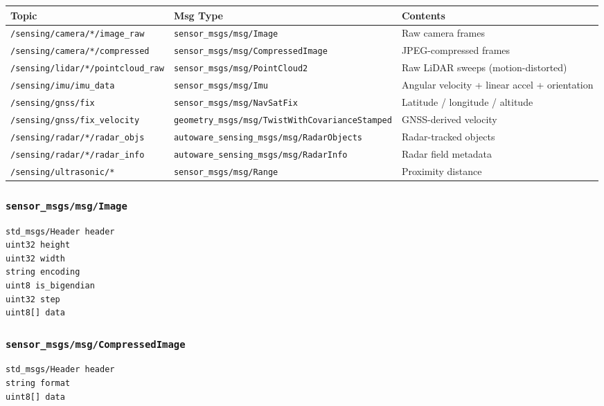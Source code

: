 \documentclass[
]{article}
\begin{document}
\begin{longtable}[]{@{}lll@{}}
\toprule\noalign{}
Topic & Msg Type & Contents \\
\midrule\noalign{}
\endhead
\bottomrule\noalign{}
\endlastfoot
\texttt{/sensing/camera/*/image\_raw} & \texttt{sensor\_msgs/msg/Image}
& Raw camera frames \\
\texttt{/sensing/camera/*/compressed} &
\texttt{sensor\_msgs/msg/CompressedImage} & JPEG-compressed frames \\
\texttt{/sensing/lidar/*/pointcloud\_raw} &
\texttt{sensor\_msgs/msg/PointCloud2} & Raw LiDAR sweeps
(motion-distorted) \\
\texttt{/sensing/imu/imu\_data} & \texttt{sensor\_msgs/msg/Imu} &
Angular velocity + linear accel + orientation \\
\texttt{/sensing/gnss/fix} & \texttt{sensor\_msgs/msg/NavSatFix} &
Latitude / longitude / altitude \\
\texttt{/sensing/gnss/fix\_velocity} &
\texttt{geometry\_msgs/msg/TwistWithCovarianceStamped} & GNSS-derived
velocity \\
\texttt{/sensing/radar/*/radar\_objs} &
\texttt{autoware\_sensing\_msgs/msg/RadarObjects} & Radar-tracked
objects \\
\texttt{/sensing/radar/*/radar\_info} &
\texttt{autoware\_sensing\_msgs/msg/RadarInfo} & Radar field metadata \\
\texttt{/sensing/ultrasonic/*} & \texttt{sensor\_msgs/msg/Range} &
Proximity distance \\
\end{longtable}

\subsubsection{\texorpdfstring{\texttt{sensor\_msgs/msg/Image}}{sensor\_msgs/msg/Image}}\label{sensor_msgsmsgimage}

\begin{verbatim}
std_msgs/Header header
uint32 height
uint32 width
string encoding
uint8 is_bigendian
uint32 step
uint8[] data
\end{verbatim}

\subsubsection{\texorpdfstring{\texttt{sensor\_msgs/msg/CompressedImage}}{sensor\_msgs/msg/CompressedImage}}\label{sensor_msgsmsgcompressedimage}

\begin{verbatim}
std_msgs/Header header
string format
uint8[] data
\end{verbatim}
\end{document}
